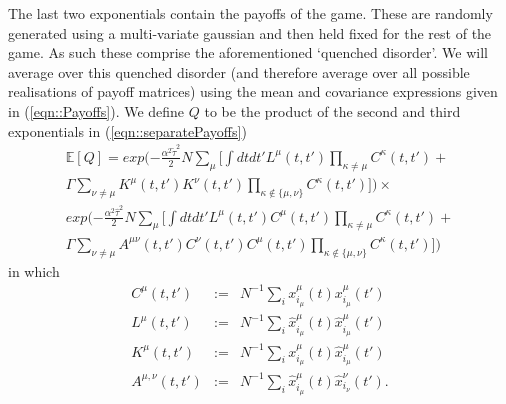 \documentclass[sigconf,anonymous]{aamas}
\newcommand{\xmu}[2]{x_{#1_#2}^{#2}(t)}
\newcommand{\xmudash}[2]{x_{#1_#2}^{#2}(t')}
\newcommand{\hxmu}[1]{\hat{x}_{#1_\mu}^{\mu} (t)}
\newcommand{\hxmudash}[1]{\hat{x}_{#1_\mu}^{\mu} (t')}
\newcommand{\hxnudash}[1]{\hat{x}_{#1_\nu}^{\nu} (t')}
\newcommand{\ttau}{\tilde{\tau}}
\newcommand{\htau}{\hat{\tau}}
\begin{document}
The last two exponentials contain the payoffs of the game. These are randomly generated using a multi-variate gaussian and then held fixed for the rest of the game. As such these comprise the aforementioned `quenched disorder'. We will average over this quenched disorder (and therefore average over all possible realisations of payoff matrices) using the mean and covariance expressions given in (\ref{eqn::Payoffs}). We define $Q$ to be the product of the second and third exponentials in (\ref{eqn::separatePayoffs}) 
%
\begin{equation}
\begin{split}
        \mathbb{E}[Q] = exp(- \frac{\alpha^2 \ttau ^2}{2} N \sum_{\mu} \Big [ \int dt dt' L^\mu(t, t') \prod_{\kappa \neq \mu} C^\kappa (t, t') + \\ \Gamma \sum_{\nu \neq \mu} K^\mu (t, t') K^\nu (t, t') \prod_{\kappa \not\in \{\mu, \nu\}} C^\kappa (t, t') \Big ] ) \times \\
        exp(- \frac{\alpha^2 \htau ^2}{2} N \sum_{\mu} \Big [ \int dt dt' L^\mu(t, t') C^\mu (t, t') \prod_{\kappa \neq \mu} C^\kappa (t, t') + \\ \Gamma \sum_{\nu \neq \mu} A^{\mu \nu} (t, t') C^\nu (t, t') C^\mu (t, t') \prod_{\kappa \not\in \{\mu, \nu\}} C^\kappa (t, t') \Big ] )
\end{split}
\end{equation}
%
in which
%
\begin{eqnarray*}
\label{eqn::correlations}
        C^\mu (t, t') &  := & N^{-1} \sum_i \xmu{i}{\mu} \xmudash{i}{\mu} \\
        L^\mu (t, t') & :=  & N^{-1} \sum_i \hxmu{i} \hxmudash{i} \\
        K^\mu (t, t') & :=  & N^{-1} \sum_i \xmu{i}{\mu} \hxmudash{i} \\
        A^{\mu, \nu} (t, t') & := &  N^{-1} \sum_i \hxmu{i} \hxnudash{i}.
\end{eqnarray*}
\end{document}
